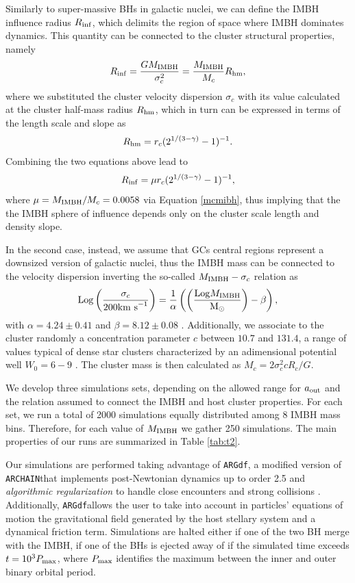 \documentclass[useAMS,usenatbib]{mn2e}
\newcommand{\Log}{{\rm Log}}
\newcommand{\Ms}{{\rm M}_\odot}
\newcommand{\ibh}{{\rm IMBH}}
\newcommand{\out}{{\rm out}}
\newcommand{\ARGdf}{\texttt{ARGdf}}
\newcommand{\ARCHAIN}{\texttt{ARCHAIN}}
\begin{document}
Similarly to super-massive BHs in galactic nuclei, we can define the IMBH influence radius $R_{\rm inf}$, which delimits the region of space where IMBH dominates dynamics. This quantity can be connected to the cluster structural properties, namely
 \begin{equation}
 R_{\rm inf} = \frac{GM_\ibh}{\sigma_c^2} = \frac{M_\ibh}{M_c}R_{\rm hm},
 \end{equation}
 where we substituted the cluster velocity dispersion $\sigma_c$ with its value calculated at the cluster half-mass radius $R_{\rm hm}$, which in turn can be expressed in terms of the length scale and slope as
\begin{equation}
R_{\rm hm} = r_c(2^{1/(3-\gamma)}-1)^{-1}.
\end{equation} 
Combining the two equations above lead to 
\begin{equation}
R_{\rm inf} = \mu r_c(2^{1/(3-\gamma)}-1)^{-1},
\end{equation}
where $\mu = M_\ibh/M_c = 0.0058$ via Equation \ref{mcmibh}, thus implying that the the IMBH sphere of influence depends only on the cluster scale length and density slope. 

In the second case, instead, we assume that GCs central regions represent a downsized version of galactic nuclei, thus the IMBH mass can be connected to the velocity dispersion inverting the so-called $M_\ibh - \sigma_c$ relation as 
\begin{equation}
     \Log \left(\frac{\sigma_c}{200{\rm km~s}^{-1}}\right) = \frac{1}{\alpha}\left(\left(\frac{\Log M_\ibh}{\Ms}\right) - \beta\right) ,
\end{equation}
with $\alpha = 4.24\pm0.41$ and $\beta=8.12\pm 0.08$ \citep{gultekin09}. Additionally, we associate to the cluster randomly a concentration parameter $c$ between $10.7$ and $131.4$, a range of values typical of dense star clusters characterized by an adimensional potential well $W_0 = 6-9$ \citep{king62}. The cluster mass is then calculated as $M_c = 2\sigma_c^2 c R_c / G$.

We develop three simulations sets, depending on the allowed range for $a_\out$ and the relation assumed to connect the IMBH and host cluster properties. For each set, we run a total of 2000 simulations equally distributed among 8 IMBH mass bins. Therefore, for each value of $M_\ibh$ we gather 250 simulations. The main properties of our runs are summarized in Table \ref{tab:t2}.

Our simulations are performed taking advantage of \ARGdf \citep{ASCD19}, a modified version of \ARCHAIN that implements post-Newtonian dynamics up to order 2.5 and {\it algorithmic regularization} to handle close encounters and strong collisions \citep{mikkola99,mikkola08}. Additionally, \ARGdf allows the user to take into account in particles' equations of motion the gravitational field generated by the host stellary system and a dynamical friction term. Simulations are halted either if one of the two BH merge with the IMBH, if one of the BHs is ejected away of if the simulated time exceeds $t = 10^3 P_{\rm max}$, where $P_{\rm max}$ identifies the maximum between the inner and outer binary orbital period.
\end{document}
